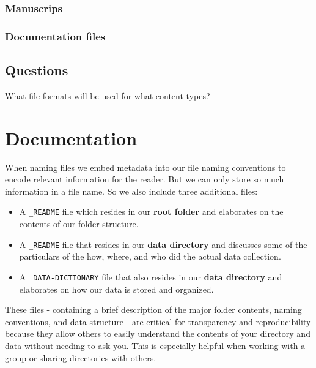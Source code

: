 \documentclass[
]{book}
\providecommand{\tightlist}{%
  \setlength{\itemsep}{0pt}\setlength{\parskip}{0pt}}
\begin{document}
\hypertarget{manuscrips}{%
\subsection*{Manuscrips}\label{manuscrips}}

\hypertarget{documentation-files}{%
\subsection*{Documentation files}\label{documentation-files}}

\hypertarget{questions-4}{%
\section*{Questions}\label{questions-4}}

What file formats will be used for what content types?

\hypertarget{documentation-1}{%
\chapter*{Documentation}\label{documentation-1}}

When naming files we embed metadata into our file naming conventions to encode relevant information for the reader. But we can only store so much information in a file name. So we also include three additional files:

\begin{itemize}
\tightlist
\item
  A \texttt{\_README} file which resides in our \textbf{root folder} and elaborates on the contents of our folder structure.
\item
  A \texttt{\_README} file that resides in our \textbf{data directory} and discusses some of the particulars of the how, where, and who did the actual data collection.
\item
  A \texttt{\_DATA-DICTIONARY} file that also resides in our \textbf{data directory} and elaborates on how our data is stored and organized.
\end{itemize}

These files - containing a brief description of the major folder contents, naming conventions, and data structure - are critical for transparency and reproducibility because they allow others to easily understand the contents of your directory and data without needing to ask you. This is especially helpful when working with a group or sharing directories with others.
\end{document}
